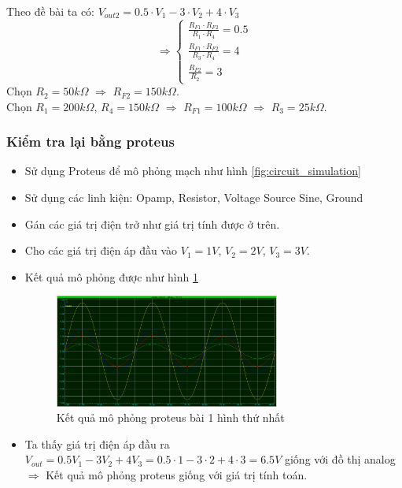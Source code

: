 				\hspace*{0.6cm}Theo đề bài ta có: $V_{out2} = 0.5 \cdot V_1 - 3 \cdot V_2 + 4 \cdot V_3$
				\[
				\Rightarrow
				\begin{cases}
					\frac{R_{F1} \cdot R_{F2}}{R_1 \cdot R_4} = 0.5\\
					\frac{R_{F1} \cdot R_{F2}}{R_3 \cdot R_4} = 4\\
					\frac{R_{F2}}{R_2} = 3
				\end{cases}
				\]
				\hspace*{0.6cm}Chọn $R_{2} = 50k\Omega$ $\Rightarrow$ $R_{F2} = 150k\Omega$.\\
				\hspace*{0.6cm}Chọn $R_{1} = 200k\Omega$, $R_{4} = 150k\Omega$ $\Rightarrow$ $R_{F1} = 100k\Omega$ $\Rightarrow$ $R_3 = 25k\Omega$.\\
			\newpage
			\subsubsection{Kiểm tra lại bằng proteus}
				\begin{itemize}
					\item Sử dụng Proteus để mô phỏng mạch như hình \ref{fig:circuit_simulation}
					\item Sử dụng các linh kiện: Opamp, Resistor, Voltage Source Sine, Ground
					\item Gán các giá trị điện trở như giá trị tính được ở trên.
					\item Cho các giá trị điện áp đầu vào $V_1 = 1V$, $V_2 = 2V$, $V_3 = 3V$.
					\item Kết quả mô phỏng được như hình \ref{fig:result_simulation}
					\begin{figure}[H]
						\centering
						\includegraphics[width=0.7\textwidth]{pictures/result1_a.png}
						\caption{Kết quả mô phỏng proteus bài 1 hình thứ nhất}					
						\label{fig:result_simulation}
					\end{figure}
					\item Ta thấy giá trị điện áp đầu ra $V_{out} = 0.5V_1 - 3V_2 + 4V_3 = 0.5 \cdot 1 - 3 \cdot 2 + 4 \cdot 3 = 6.5V$ giống với đồ thị analog $\Rightarrow$ Kết quả mô phỏng proteus giống với giá trị tính toán.
				\end{itemize}
